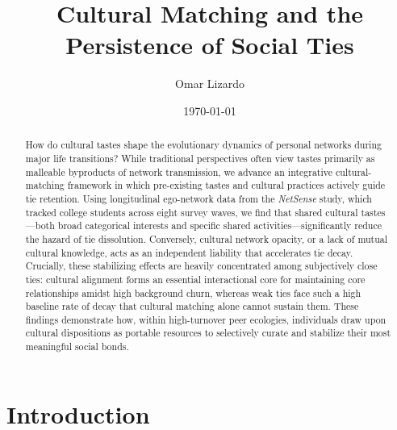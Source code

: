 \documentclass[
  letterpaper,
  DIV=11,
  numbers=noendperiod]{scrartcl}
\title{Cultural Matching and the Persistence of Social Ties}
\author{Omar Lizardo}
\date{\today}
\begin{document}
\maketitle

\begin{abstract}
How do cultural tastes shape the evolutionary dynamics of personal networks during major life transitions? While traditional perspectives often view tastes primarily as malleable byproducts of network transmission, we advance an integrative cultural-matching framework in which pre-existing tastes and cultural practices actively guide tie retention. Using longitudinal ego-network data from the \textit{NetSense} study, which tracked college students across eight survey waves, we find that shared cultural tastes—both broad categorical interests and specific shared activities—significantly reduce the hazard of tie dissolution. Conversely, cultural network opacity, or a lack of mutual cultural knowledge, acts as an independent liability that accelerates tie decay. Crucially, these stabilizing effects are heavily concentrated among subjectively close ties: cultural alignment forms an essential interactional core for maintaining core relationships amidst high background churn, whereas weak ties face such a high baseline rate of decay that cultural matching alone cannot sustain them. These findings demonstrate how, within high-turnover peer ecologies, individuals draw upon cultural dispositions as portable resources to selectively curate and stabilize their most meaningful social bonds.
\end{abstract}

\newpage
\section{Introduction}\label{introduction}
\end{document}
